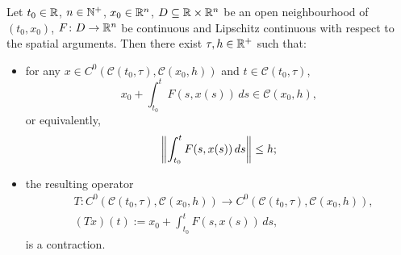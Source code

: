 \begin{proposition}
  Let
    $t_0 \in \mathbb{R}$,
    $n \in \mathbb{N}^+$,
    $x_0 \in \mathbb{R}^n$,
    $D \subseteq \mathbb{R} \times \mathbb{R}^n$ be an open neighbourhood of $(t_0, x_0)$,
    $F \colon D \to \mathbb{R}^n$ be continuous and Lipschitz continuous with respect to
      the spatial arguments.
  Then there exist $\tau, h \in \mathbb{R}^+$ such that:
  \begin{itemize}
    \item
      for any
      $x \in C^0(\mathcal{C}(t_0, \tau), \mathcal{C}(x_0, h))$ and
      $t \in \mathcal{C}(t_0, \tau)$,
      \begin{equation}
        x_0 + \int_{t_0}^t F(s, x(s))\, d s \in \mathcal{C}(x_0, h),
      \end{equation}
      or equivalently,
      \begin{equation}
        \left\lVert\int_{t_0}^t F(s, x(s))\, d s\right\rVert \leq h;
      \end{equation}
    \item
      the resulting operator
      \begin{equation}
        \label{equation:ordinary_differential_equation/initial_value_problem/operator}
        \begin{split}
          & T
            \colon C^0(\mathcal{C}(t_0, \tau), \mathcal{C}(x_0, h))
            \to C^0(\mathcal{C}(t_0, \tau), \mathcal{C}(x_0, h)), \\
          & (T x)(t) := x_0 + \int_{t_0}^t F(s, x(s))\, d s,
        \end{split}
      \end{equation}
      is a contraction.
  \end{itemize}
\end{proposition}
